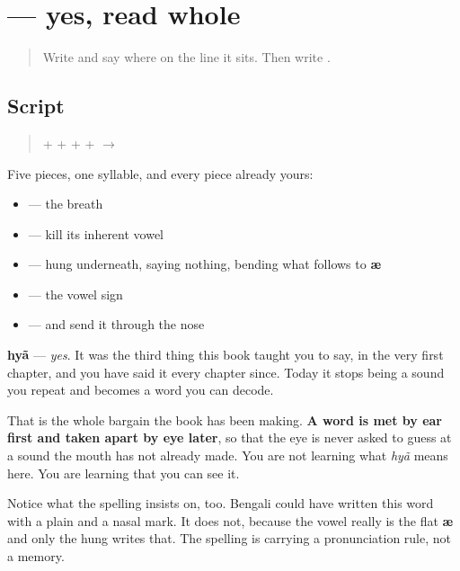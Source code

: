 \section[\texorpdfstring{\bn{হ্যাঁ} (hyã)}{হ্যাঁ (hyã)}]{ — yes, read whole}

\label{lesson:BN-W02-hyan-read}



\begin{quote}
Write \textbf{} and say where on the line it sits. Then write \textbf{}.
\end{quote}

\subsection*{Script}
\begin{quote}
\textbf{} + \textbf{} + \textbf{} + \textbf{} + \textbf{} $\to$ \textbf{}
\end{quote}

Five pieces, one syllable, and every piece already yours:

\begin{itemize}
\raggedright
  \item \textbf{} — the breath
  \item \textbf{} — kill its inherent vowel
  \item \textbf{} — hung underneath, saying nothing, bending what follows to \textbf{æ}
  \item \textbf{} — the vowel sign
  \item \textbf{} — and send it through the nose
\end{itemize}

\textbf{hyã} — \emph{yes}. It was the third thing this book taught you to say, in the very first chapter, and you have said it every chapter since. Today it stops being a sound you repeat and becomes a word you can decode.

That is the whole bargain the book has been making. \textbf{A word is met by ear first and taken apart by eye later}, so that the eye is never asked to guess at a sound the mouth has not already made. You are not learning what \emph{hyã} means here. You are learning that you can see it.

Notice what the spelling insists on, too. Bengali could have written this word with a plain \textbf{} and a nasal mark. It does not, because the vowel really is the flat \textbf{æ} and only the hung \textbf{} writes that. The spelling is carrying a pronunciation rule, not a memory.

